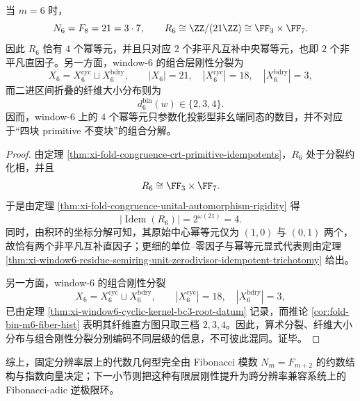 \begin{proposition}\label{prop:xi-window6-resolution-arithmetic-split-separation}
当 \(m=6\) 时，
\[
N_6=F_8=21=3\cdot 7,
\qquad
R_6\cong \ZZ/(21\ZZ)\cong \FF_3\times \FF_7.
\]
因此 \(R_6\) 恰有 \(4\) 个幂等元，并且只对应 \(2\) 个非平凡互补中央幂等元，也即 \(2\) 个非平凡直因子。另一方面，window-\(6\) 的组合层刚性分裂为
\[
X_6=X_6^{\mathrm{cyc}}\sqcup X_6^{\mathrm{bdry}},
\qquad
|X_6|=21,\quad |X_6^{\mathrm{cyc}}|=18,\quad |X_6^{\mathrm{bdry}}|=3,
\]
而二进区间折叠的纤维大小分布则为
\[
d_6^{\mathrm{bin}}(w)\in\{2,3,4\}.
\]
因而，window-\(6\) 上的 \(4\) 个幂等元只参数化投影型非幺端同态的数目，并不对应于“四块 primitive 不变块”的组合分解。
\end{proposition}
\begin{proof}
由定理 \ref{thm:xi-fold-congruence-crt-primitive-idempotents}，\(R_6\) 处于分裂约化相，并且
\[
R_6\cong \FF_3\times \FF_7.
\]
于是由定理 \ref{thm:xi-fold-congruence-unital-automorphism-rigidity} 得
\[
|\operatorname{Idem}(R_6)|=2^{\omega(21)}=4.
\]
同时，由积环的坐标分解可知，其原始中心幂等元仅为 \((1,0)\) 与 \((0,1)\) 两个，故恰有两个非平凡互补直因子；更细的单位--零因子与幂等元显式代表则由定理 \ref{thm:xi-window6-residue-semiring-unit-zerodivisor-idempotent-trichotomy} 给出。

另一方面，window-\(6\) 的组合刚性分裂
\[
X_6=X_6^{\mathrm{cyc}}\sqcup X_6^{\mathrm{bdry}},
\qquad
|X_6^{\mathrm{cyc}}|=18,\quad |X_6^{\mathrm{bdry}}|=3,
\]
已由定理 \ref{thm:xi-window6-cyclic-kernel-bc3-root-datum} 记录，而推论 \ref{cor:fold-bin-m6-fiber-hist} 表明其纤维直方图只取三档 \(2,3,4\)。因此，算术分裂、纤维大小分布与组合刚性分裂分别编码不同层级的信息，不可彼此混同。证毕。
\end{proof}

\noindent 综上，固定分辨率层上的代数几何型完全由 Fibonacci 模数 \(N_m=F_{m+2}\) 的约数结构与指数向量决定；下一小节则把这种有限层刚性提升为跨分辨率兼容系统上的 Fibonacci-adic 逆极限环。

\endinput
